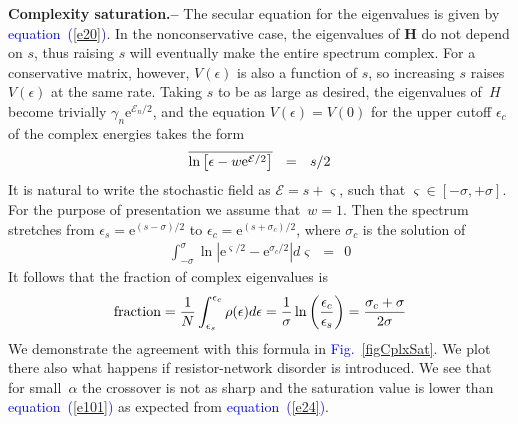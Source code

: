 \documentclass[aps,pre,floats,floatfix,twocolumn]{revtex4}
\newcommand{\eexp}[1]{\mathrm{e}^{#1}}
\newcommand{\be}[1]{\begin{eqnarray}\ifthenelse{#1=-1}{\nonumber}{\ifthenelse{#1=0}{}{\label{e#1}}}}
\newcommand{\beq}{\begin{eqnarray}}
\newcommand{\eeq}{\end{eqnarray}}
\newcommand{\Eq}[1]{\textcolor{blue}{{equation}\!~(\ref{#1})}}
\newcommand{\Fig}[1]{\textcolor{blue}{Fig.}\!\!~\ref{#1}}
\newcommand{\sect}[1]{{\bf #1.-- }}
\newcommand{\rmrk}[1]{{\color[rgb]{0.6,0,0.1} #1}}
\begin{document}
\sect{Complexity saturation}
%
The secular equation for the eigenvalues is given by \Eq{e20}.
%
In the nonconservative case, the eigenvalues of $\bm{H}$ do not depend on $s$,
thus raising $s$ will eventually make the entire spectrum complex. 
For a conservative matrix, however, $V(\epsilon)$ is also a function of $s$, 
so increasing $s$ raises $V(\epsilon)$  at the same rate.
%
Taking $s$ to be as large as desired, the eigenvalues of~$H$ 
become trivially $\gamma_{n}\eexp{\mathcal{E}_n/2}$, 
and the equation $V(\epsilon)=V(0)$ for the upper cutoff $\epsilon_c$ 
of the complex energies takes the form
%
\be{24}
\overline{\ln\left[ \epsilon - w\eexp{\mathcal{E}/2} \right]} \ \ = \ \ s/2 
\eeq
%
It is natural to write the stochastic field as $\mathcal{E}=s+\varsigma$, 
such that ${\varsigma\in[-\sigma,+\sigma]}$. 
For the purpose of presentation we assume that~$w{=}1$.  
Then the spectrum stretches from $\epsilon_s=\eexp{(s-\sigma)/2}$ 
to ${\epsilon_c=\eexp{(s+\sigma_c)/2}}$,  
where $\sigma_c$ is the solution of
%
\beq
\int_{-\sigma}^{\sigma} \ln \left| \eexp{{\varsigma}/2} - \eexp{\sigma_c /2}\right| d\varsigma  \ \ = \ \ 0 
\eeq
% 
It follows that the fraction of complex eigenvalues is 
%
\be{101}
\text{fraction} 
= \frac{1}{N}\int_{\epsilon_s}^{\epsilon_c} \rho(\epsilon) d\epsilon
= \frac{1}{\sigma}\ln\left( \frac{\epsilon_c}{\epsilon_s} \right) 
= \frac{\sigma_c + \sigma}{2\sigma}
\eeq
%
We demonstrate the agreement with this formula in \Fig{figCplxSat}.
We plot there also what happens if resistor-network disorder is introduced.
We see that for small~$\alpha$ the crossover is not as sharp and 
the saturation value is lower than \Eq{e101} as expected from \Eq{e24}. 
\end{document}
